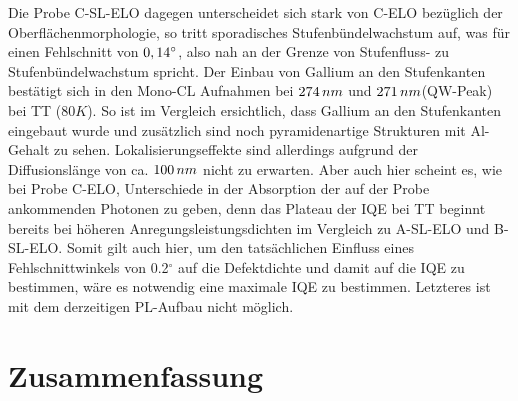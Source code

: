 Die Probe C-SL-ELO dagegen unterscheidet sich stark von C-ELO bezüglich der Oberflächenmorphologie, so tritt sporadisches Stufenbündelwachstum auf, was für einen Fehlschnitt von $0,14 \degree$, also nah an der Grenze von Stufenfluss- zu Stufenbündelwachstum spricht. Der Einbau von Gallium an den Stufenkanten bestätigt sich in den Mono-CL Aufnahmen bei $274 \thinspace nm$ und $271 \thinspace nm$(QW-Peak) bei TT ($80K$). So ist im Vergleich ersichtlich, dass Gallium an den Stufenkanten eingebaut wurde und zusätzlich sind noch pyramidenartige Strukturen mit Al-Gehalt zu sehen. Lokalisierungseffekte sind allerdings aufgrund der Diffusionslänge von ca. $100 \thinspace nm$ nicht zu erwarten. Aber auch hier scheint es, wie bei Probe C-ELO, Unterschiede in der Absorption der auf der Probe ankommenden Photonen zu geben, denn das Plateau der IQE bei TT beginnt bereits bei höheren Anregungsleistungsdichten im Vergleich zu A-SL-ELO und B-SL-ELO. Somit gilt auch hier, um den tatsächlichen Einfluss eines Fehlschnittwinkels von 0.2$^\circ$ auf die Defektdichte und damit auf die IQE zu bestimmen, wäre es notwendig eine maximale IQE zu bestimmen. Letzteres ist mit dem derzeitigen PL-Aufbau nicht möglich.


\section{Zusammenfassung}

